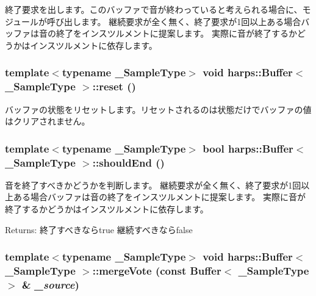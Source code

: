 終了要求を出します。このバッファで音が終わっていると考えられる場合に、モジュールが呼び出します。 継続要求が全く無く、終了要求が1回以上ある場合バッファは音の終了をインスツルメントに提案します。 実際に音が終了するかどうかはインスツルメントに依存します。 
\subsubsection[reset]{\setlength{\rightskip}{0pt plus 5cm}template$<$typename \_\-SampleType$>$ void {\bf harps::Buffer}$<$ \_\-SampleType $>$::reset ()\hspace{0.3cm}{\tt  [inline]}}\label{classharps_1_1Buffer_5c9522a1c6d2f36bfb387fc4ee1832fb}


バッファの状態をリセットします。リセットされるのは状態だけでバッファの値はクリアされません。 
\subsubsection[shouldEnd]{\setlength{\rightskip}{0pt plus 5cm}template$<$typename \_\-SampleType$>$ bool {\bf harps::Buffer}$<$ \_\-SampleType $>$::shouldEnd ()\hspace{0.3cm}{\tt  [inline]}}\label{classharps_1_1Buffer_559084a4b5a2932f04a00aefe3cb7e37}


音を終了すべきかどうかを判断します。 継続要求が全く無く、終了要求が1回以上ある場合バッファは音の終了をインスツルメントに提案します。 実際に音が終了するかどうかはインスツルメントに依存します。 \begin{Desc}
\item[Returns:]終了すべきならtrue 継続すべきならfalse \end{Desc}
\subsubsection[mergeVote]{\setlength{\rightskip}{0pt plus 5cm}template$<$typename \_\-SampleType$>$ void {\bf harps::Buffer}$<$ \_\-SampleType $>$::mergeVote (const {\bf Buffer}$<$ \_\-SampleType $>$ \& {\em \_\-source})\hspace{0.3cm}{\tt  [inline]}}\label{classharps_1_1Buffer_a42515d3024bfe66b2aea07e21e09e01}


